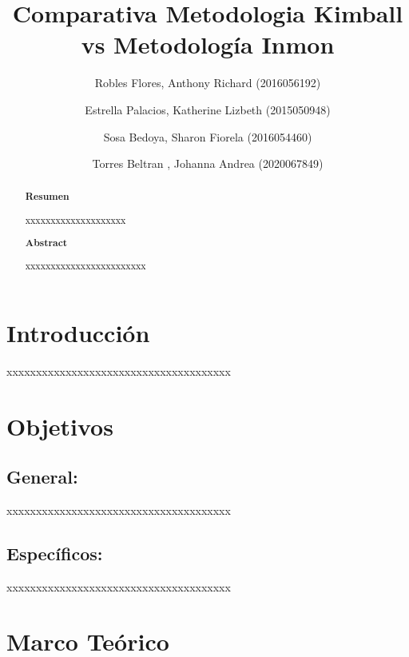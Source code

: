 \documentclass[%
 reprint,
 amsmath,amssymb,
 aps,
]{revtex4-1}
\begin{document}
\title{Comparativa Metodologia Kimball vs Metodología Inmon}
\author{Robles Flores, Anthony Richard	               (2016056192)}
\author{Estrella Palacios, Katherine Lizbeth			(2015050948)}
\author{Sosa Bedoya, Sharon Fiorela					(2016054460)}
\author{Torres Beltran , Johanna Andrea				(2020067849)}

		
%

\begin{abstract}
\begin{center}
\textbf{Resumen}
\end{center}
xxxxxxxxxxxxxxxxxxxx
\\

\begin{center}
\textbf{Abstract}
\end{center}
xxxxxxxxxxxxxxxxxxxxxxxx
\\
\end{abstract}



\maketitle


\section {Introducción}\label{sec:1}

xxxxxxxxxxxxxxxxxxxxxxxxxxxxxxxxxxxxxx
\section{Objetivos}\label{sec:2}
\subsection{General:}
xxxxxxxxxxxxxxxxxxxxxxxxxxxxxxxxxxxxxx
\subsection{Específicos:}
xxxxxxxxxxxxxxxxxxxxxxxxxxxxxxxxxxxxxx

\section {Marco Teórico}
\end{document}
